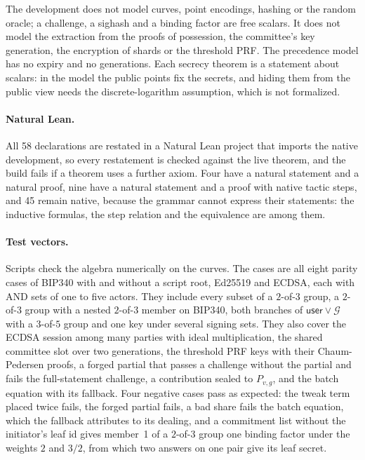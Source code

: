 The development does not model curves, point encodings, hashing or the random oracle; a challenge, a sighash and a binding factor are free scalars. It does not model the extraction from the proofs of possession, the committee's key generation, the encryption of shards or the threshold PRF. The precedence model has no expiry and no generations. Each secrecy theorem is a statement about scalars: in the model the public points fix the secrets, and hiding them from the public view needs the discrete-logarithm assumption, which is not formalized.

\paragraph{Natural Lean.} All 58 declarations are restated in a Natural Lean project that imports the native development, so every restatement is checked against the live theorem, and the build fails if a theorem uses a further axiom. Four have a natural statement and a natural proof, nine have a natural statement and a proof with native tactic steps, and 45 remain native, because the grammar cannot express their statements: the inductive formulas, the step relation and the equivalence are among them.

\paragraph{Test vectors.} Scripts check the algebra numerically on the curves. The cases are all eight parity cases of BIP340 with and without a script root, Ed25519 and ECDSA, each with AND sets of one to five actors. They include every subset of a $2$-of-$3$ group, a $2$-of-$3$ group with a nested $2$-of-$3$ member on BIP340, both branches of $\mathsf{user} \vee \mathcal{G}$ with a $3$-of-$5$ group and one key under several signing sets. They also cover the ECDSA session among many parties with ideal multiplication, the shared committee slot over two generations, the threshold PRF keys with their Chaum-Pedersen proofs, a forged partial that passes a challenge without the partial and fails the full-statement challenge, a contribution sealed to $P_{v,g}$, and the batch equation with its fallback. Four negative cases pass as expected: the tweak term placed twice fails, the forged partial fails, a bad share fails the batch equation, which the fallback attributes to its dealing, and a commitment list without the initiator's leaf id gives member~1 of a $2$-of-$3$ group one binding factor under the weights $2$ and $3/2$, from which two answers on one pair give its leaf secret.

